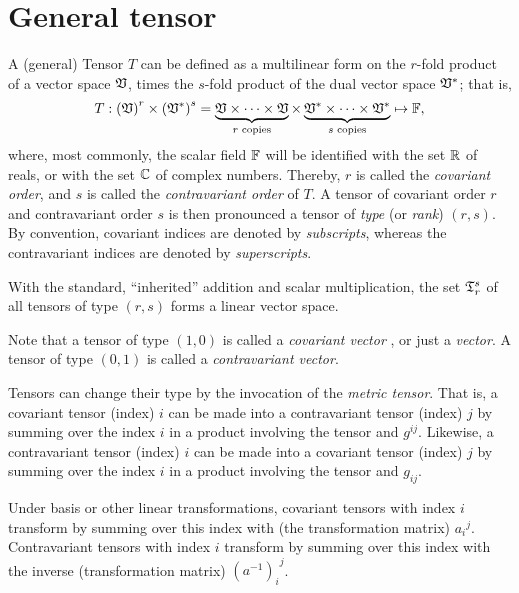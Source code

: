 \section{General tensor}

A (general) Tensor $T$ can be defined as a multilinear form  on the
$r$-fold product of a vector space ${\frak V}$, times the
$s$-fold product of the dual vector space ${\frak V}^\ast$;
that is,
\begin{equation}
T: \left( {\frak V} \right)^r \times \left( {\frak V}^\ast \right)^s
=
\underbrace{{\frak V}\times \cdots \times {\frak V}}_{r\textrm{ \scriptsize copies}}
\times
\underbrace{{\frak V}^\ast \times \cdots \times {\frak V}^\ast}_{s\textrm{ \scriptsize copies}}
\mapsto {\Bbb F}
,
 \label{2012-m-ch-tensor-gdt}
\end{equation}
where, most commonly, the scalar field
${\Bbb F}$
will be identified with the set ${\Bbb R}$ of reals,
or with the set ${\Bbb C}$ of complex numbers.
Thereby,
$r$ is called the
{\em covariant order}, and
$s$ is called the
{\em contravariant order}
of $T$.
A tensor of covariant order $r$ and contravariant order $s$
is then pronounced a tensor of
{\em type} (or {\em rank})
$(r,s)$.
By convention, covariant indices are denoted by {\em subscripts},
whereas the contravariant indices  are denoted by {\em superscripts}.

With the standard, ``inherited'' addition and scalar multiplication,
the set ${\frak T}_r^s$ of all tensors of type $(r,s)$
forms a linear vector space.


Note that a tensor of type $(1,0)$ is called  a
{\em covariant vector}
,
or just a
{\em vector}.
A tensor of type $(0,1)$ is called a
{\em contravariant vector}.

Tensors can change their type by the invocation of the {\em metric tensor}.
That is, a covariant tensor (index) $i$ can be made into a contravariant tensor (index) $j$
by summing over the index $i$ in a product involving the tensor and $g^{ij}$.
Likewise,  a contravariant tensor (index) $i$ can be made into a covariant tensor (index) $j$
by summing over the index $i$ in a product involving the tensor and $g_{ij}$.


Under basis or other linear transformations,
covariant tensors with index $i$ transform by summing over this index with (the transformation matrix) ${a_i}^j$.
Contravariant tensors with index $i$ transform by summing over this index with the inverse (transformation matrix)  ${(a^{-1})_i}^j$.

